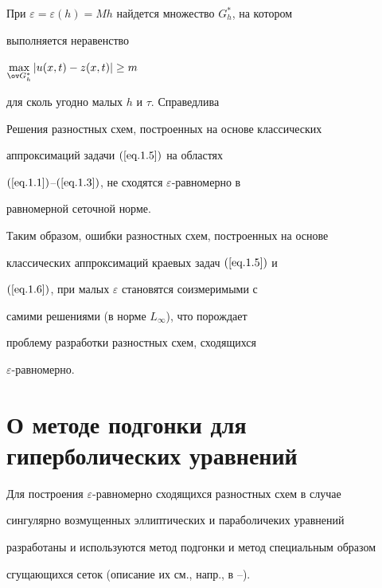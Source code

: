 При $\varepsilon=\varepsilon(h)=M h$ найдется множество $G^*_h$, на котором


выполняется неравенство


$\max\limits_{\ov G^*_h} |u(x, t)-z(x, t)|\ge m\,$


для сколь угодно малых $h$ и $\tau$. Справедлива





\begin{thms}\label{t2.2}


Решения разностных схем, построенных на основе классических


аппроксимаций задачи $(\ref{eq.1.5})$ на областях


$(\ref{eq.1.1})$--$(\ref{eq.1.3})$, не сходятся $\varepsilon$-равномерно в


равномерной сеточной норме.


\end{thms}





Таким образом, ошибки разностных схем, построенных на основе


классических аппроксимаций краевых задач $(\ref{eq.1.5})$ и


$(\ref{eq.1.6})$, при малых $\varepsilon$ становятся соизмеримыми с


самими решениями (в норме $L_{\infty}$), что порождает


проблему разработки разностных схем, сходящихся


$\varepsilon$-равномерно. \vspace{1mm}





\section{О методе подгонки для гиперболических уравнений}


\label{section.3}





Для построения $\varepsilon$-равномерно сходящихся разностных схем в случае


сингулярно возмущенных эллиптических и параболичеких уравнений


разработаны и используются метод подгонки и метод специальным образом


сгущающихся сеток (описание их см., напр., в \cite{3}--\cite{8}).


